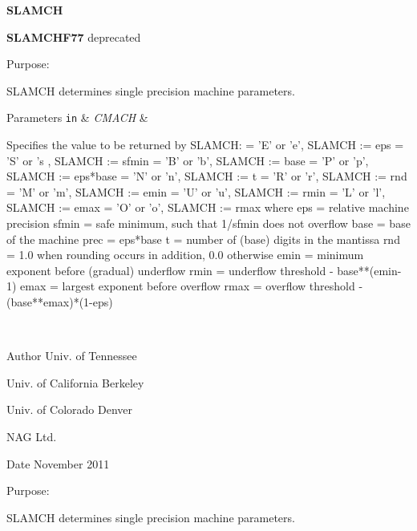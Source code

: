{\bfseries S\+L\+A\+M\+C\+H} 

{\bfseries S\+L\+A\+M\+C\+H\+F77} deprecated

\begin{DoxyParagraph}{Purpose\+: }
\begin{DoxyVerb} SLAMCH determines single precision machine parameters.\end{DoxyVerb}
 
\end{DoxyParagraph}

\begin{DoxyParams}[1]{Parameters}
\mbox{\tt in}  & {\em C\+M\+A\+C\+H} & \begin{DoxyVerb}          Specifies the value to be returned by SLAMCH:
          = 'E' or 'e',   SLAMCH := eps
          = 'S' or 's ,   SLAMCH := sfmin
          = 'B' or 'b',   SLAMCH := base
          = 'P' or 'p',   SLAMCH := eps*base
          = 'N' or 'n',   SLAMCH := t
          = 'R' or 'r',   SLAMCH := rnd
          = 'M' or 'm',   SLAMCH := emin
          = 'U' or 'u',   SLAMCH := rmin
          = 'L' or 'l',   SLAMCH := emax
          = 'O' or 'o',   SLAMCH := rmax
          where
          eps   = relative machine precision
          sfmin = safe minimum, such that 1/sfmin does not overflow
          base  = base of the machine
          prec  = eps*base
          t     = number of (base) digits in the mantissa
          rnd   = 1.0 when rounding occurs in addition, 0.0 otherwise
          emin  = minimum exponent before (gradual) underflow
          rmin  = underflow threshold - base**(emin-1)
          emax  = largest exponent before overflow
          rmax  = overflow threshold  - (base**emax)*(1-eps)\end{DoxyVerb}
 \\
\hline
\end{DoxyParams}
\begin{DoxyAuthor}{Author}
Univ. of Tennessee 

Univ. of California Berkeley 

Univ. of Colorado Denver 

N\+A\+G Ltd. 
\end{DoxyAuthor}
\begin{DoxyDate}{Date}
November 2011
\end{DoxyDate}
\begin{DoxyParagraph}{Purpose\+: }
\begin{DoxyVerb} SLAMCH determines single precision machine parameters.\end{DoxyVerb}
 
\end{DoxyParagraph}

